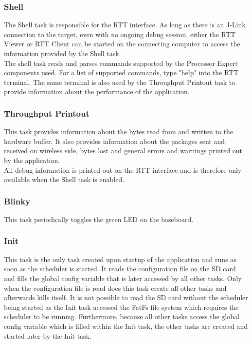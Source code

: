 \subsubsection{Shell}
The Shell task is responsible for the RTT interface. As long as there is an J-Link connection to the target, even with no ongoing debug session, either the RTT Viewer or RTT Client can be started on the connecting computer to access the information provided by the Shell task.\\
The shell task reads and parses commands supported by the Processor Expert components used. For a list of supported commands, type "help" into the RTT terminal. The same terminal is also used by the Throughput Printout task to provide information about the performance of the application.
%
\subsubsection{Throughput Printout}
This task provides information about the bytes read from and written to the hardware buffer. It also provides information about the packages sent and received on wireless side, bytes lost and general errors and warnings printed out by the application.\\
All debug information is printed out on the RTT interface and is therefore only available when the Shell task is enabled.
%
\subsubsection{Blinky}
This task periodically toggles the green LED on the baseboard.
%
\subsubsection{Init}
This task is the only task created upon startup of the application and runs as soon as the scheduler is started. It reads the configuration file on the SD card and fills the global config variable that is later accessed by all other tasks. Only when the configuration file is read does this task create all other tasks and afterwards kills itself. It is not possible to read the SD card without the scheduler being started as the Init task accessed the FatFs file system which requires the scheduler to be running. Furthermore, because all other tasks access the global config variable which is filled within the Init task, the other tasks are created and started later by the Init task.
%
